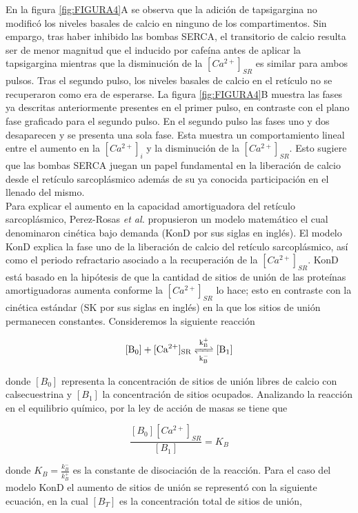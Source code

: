 \documentclass[draft]{article}
\newcommand{\Cai}{[Ca^{2+}]_{i}}
\newcommand{\Cal}{[Ca^{2+}]_{SR}}
\newcommand{\al}{\textit{et al.} }
\begin{document}
En la figura \ref{fig:FIGURA4}A se observa que la adición de tapsigargina no modificó los niveles basales de calcio en ninguno de los compartimentos. Sin empargo, tras haber inhibido las bombas SERCA, el transitorio de calcio resulta ser de menor magnitud que el inducido por cafeína antes de aplicar la tapsigargina mientras que la disminución de la $\Cal$ es similar para ambos pulsos. Tras el segundo pulso, los niveles basales de calcio en el retículo no se recuperaron como era de esperarse. La figura \ref{fig:FIGURA4}B muestra las fases ya descritas anteriormente presentes en el primer pulso, en contraste con el plano fase graficado para el segundo pulso. En el segundo pulso las fases uno y dos desaparecen y se presenta una sola fase. Esta muestra un comportamiento lineal entre el aumento en la $\Cai$ y la disminución de la $\Cal$. Esto sugiere que las bombas SERCA juegan un papel fundamental en la liberación de calcio desde el retículo sarcoplásmico además de su ya conocida participación en el llenado del mismo. \\

Para explicar el aumento en la capacidad amortiguadora del retículo sarcoplásmico, Perez-Rosas \al \cite{Perez-Rosas2015} propusieron un modelo matemático el cual denominaron cinética bajo demanda (KonD por sus siglas en inglés). El modelo KonD explica la fase uno de la liberación de calcio del retículo sarcoplásmico, así como el periodo refractario asociado a la recuperación de la $\Cal$. KonD está basado en la hipótesis de que la cantidad de sitios de unión de las proteínas amortiguadoras aumenta conforme la $\Cal$ lo hace; esto en contraste con la cinética estándar (SK por sus siglas en inglés) en la que los sitios de unión permanecen constantes. Consideremos la siguiente reacción

\begin{equation*}
\ce{{[B_0]} + {\Cal} <=>[k^{+}_B][k^{-}_B] {[B_1]} }
\end{equation*}
 
donde $[B_0]$ representa la concentración de sitios de unión libres de calcio con calsecuestrina y $[B_1]$ la concentración de sitios ocupados. Analizando la reacción en el equilibrio químico, por la ley de acción de masas se tiene que

\begin{equation}\label{BS}
\frac{[B_0][Ca^{2+}]_{SR}}{[B_1]}= K_B
\end{equation}

donde $K_B = \frac{k^{-}_B}{k^{+}_B}$ es la constante de disociación de la reacción. Para el caso del modelo KonD el aumento de sitios de unión se representó con la siguiente ecuación, en la cual $[B_T]$ es la concentración total de sitios de unión,
\end{document}
